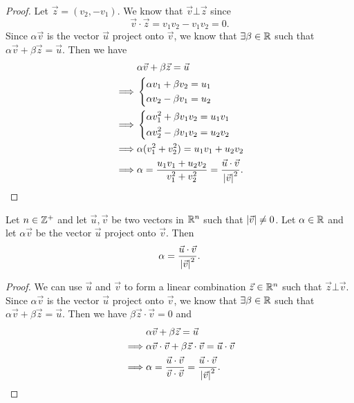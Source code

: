 \begin{proof}
  Let \(\vec{z} = (v_2, -v_1)\).
  We know that \(\vec{v} \bot \vec{z}\) since
  \[
    \vec{v} \cdot \vec{z} = v_1 v_2 - v_1 v_2 = 0.
  \]
  Since \(\alpha \vec{v}\) is the vector \(\vec{u}\) project onto \(\vec{v}\), we know that \(\exists \beta \in \mathbb{R}\) such that \(\alpha \vec{v} + \beta \vec{z} = \vec{u}\).
  Then we have
  \begin{align*}
             & \alpha \vec{v} + \beta \vec{z} = \vec{u}                                                            \\
    \implies & \begin{dcases}
                 \alpha v_1 + \beta v_2 = u_1 \\
                 \alpha v_2 - \beta v_1 = u_2
               \end{dcases}                                                                        \\
    \implies & \begin{dcases}
                 \alpha v_1^2 + \beta v_1 v_2 = u_1 v_1 \\
                 \alpha v_2^2 - \beta v_1 v_2 = u_2 v_2
               \end{dcases}                                                              \\
    \implies & \alpha (v_1^2 + v_2^2) = u_1 v_1 + u_2 v_2                                                          \\
    \implies & \alpha = \dfrac{u_1 v_1 + u_2 v_2}{v_1^2 + v_2^2} = \dfrac{\vec{u} \cdot \vec{v}}{\left\lvert\vec{v}\right\rvert^2}.
  \end{align*}
\end{proof}

\begin{ac}\label{ii:ac:1.1.2}
  Let \(n \in \mathbb{Z}^+\) and let \(\vec{u}, \vec{v}\) be two vectors in \(\mathbb{R}^n\) such that \(\left\lvert\vec{v}\right\rvert \neq 0\).
  Let \(\alpha \in \mathbb{R}\) and let \(\alpha \vec{v}\) be the vector \(\vec{u}\) project onto \(\vec{v}\).
  Then
  \[
    \alpha = \dfrac{\vec{u} \cdot \vec{v}}{\left\lvert\vec{v}\right\rvert^2}.
  \]
\end{ac}

\begin{proof}
  We can use \(\vec{u}\) and \(\vec{v}\) to form a linear combination \(\vec{z} \in \mathbb{R}^n\) such that \(\vec{z} \bot \vec{v}\).
  Since \(\alpha \vec{v}\) is the vector \(\vec{u}\) project onto \(\vec{v}\), we know that \(\exists \beta \in \mathbb{R}\) such that \(\alpha \vec{v} + \beta \vec{z} = \vec{u}\).
  Then we have \(\beta \vec{z} \cdot \vec{v} = 0\) and
  \begin{align*}
             & \alpha \vec{v} + \beta \vec{z} = \vec{u}                                                                        \\
    \implies & \alpha \vec{v} \cdot \vec{v} + \beta \vec{z} \cdot \vec{v} = \vec{u} \cdot \vec{v}                              \\
    \implies & \alpha = \dfrac{\vec{u} \cdot \vec{v}}{\vec{v} \cdot \vec{v}} = \dfrac{\vec{u} \cdot \vec{v}}{\left\lvert\vec{v}\right\rvert^2}.
  \end{align*}
\end{proof}

